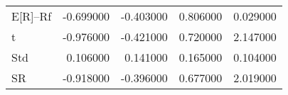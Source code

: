 \begin{tabular}{lrrrr}
\toprule
\midrule
E[R]--Rf & -0.699000 & -0.403000 & 0.806000 & 0.029000 \\
t & -0.976000 & -0.421000 & 0.720000 & 2.147000 \\
Std & 0.106000 & 0.141000 & 0.165000 & 0.104000 \\
SR & -0.918000 & -0.396000 & 0.677000 & 2.019000 \\
\bottomrule
\end{tabular}
